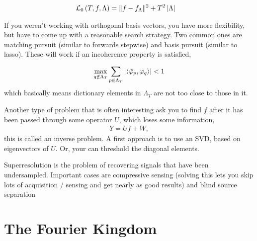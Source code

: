 \documentclass{article}
\begin{document}
\begin{align}
\mathcal{L}_{0}\left(T, f, \Lambda\right) &= \|f - f_{\Lambda}\|^{2} + T^{2}\left|\Lambda\right|
\end{align}

If you weren't working with orthogonal basis vectors, you have more flexibility,
but have to come up with a reasonable search strategy. Two common ones are
matching pursuit (similar to forwards stepwise) and basis pursuit (similar to
lasso). These will work if an incoherence property is satisfied,

\begin{align}
\max_{q \notin \Lambda_{T}} \sum_{p \in \Lambda_{T}} \left|\left<\tilde{\varphi}_p, \varphi_q\right>\right| < 1
\end{align}
which basically means dictionary elements in $\Lambda_{T}$ are not too close to
those in it.

Another type of problem that is often interesting ask you to find $f$ after it
has been passed through some operator $U$, which loses some information,
\begin{align}
Y = U f + W,
\end{align}
this is called an inverse problem. A first approach is to use an SVD, based on
eigenvectors of $U$. Or, your can threshold the diagonal elements.

Superresolution is the problem of recovering signals that have been
undersampled. Important cases are compressive sensing (solving this lets you
skip lots of acquisition / sensing and get nearly as good results) and blind
source separation

\section{The Fourier Kingdom}
\label{sec:chapter_2}
\end{document}
